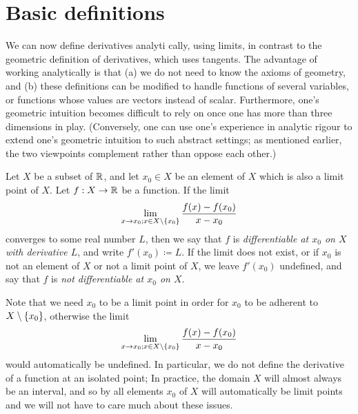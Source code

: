 \section{Basic definitions}\label{i:sec:10.1}

\begin{note}
  We can now define derivatives analyti cally, using limits, in contrast to the geometric definition of derivatives, which uses tangents.
  The advantage of working analytically is that
  (a) we do not need to know the axioms of geometry, and
  (b) these definitions can be modified to handle functions of several variables, or functions whose values are vectors instead of scalar.
  Furthermore, one's geometric intuition becomes difficult to rely on once one has more than three dimensions in play.
  (Conversely, one can use one's experience in analytic rigour to extend one's geometric intuition to such abstract settings;
  as mentioned earlier, the two viewpoints complement rather than oppose each other.)
\end{note}

\begin{defn}\label{i:10.1.1}
  Let \(X\) be a subset of \(\mathbb{R}\), and let \(x_0 \in X\) be an element of \(X\) which is also a limit point of \(X\).
  Let \(f : X \to \mathbb{R}\) be a function.
  If the limit
  \[
    \lim_{x \to x_0 ; x \in X \setminus \left\lbrace x_0\right\rbrace} \dfrac{f(x) - f(x_0)}{x - x_0}
  \]
  converges to some real number \(L\), then we say that \(f\) is \emph{differentiable at \(x_0\) on \(X\) with derivative \(L\)}, and write \(f'(x_0) \coloneqq L\).
  If the limit does not exist, or if \(x_0\) is not an element of \(X\) or not a limit point of \(X\), we leave \(f'(x_0)\) undefined, and say that \(f\) is \emph{not differentiable at \(x_0\) on \(X\)}.
\end{defn}

\begin{rmk}\label{i:10.1.2}
  Note that we need \(x_0\) to be a limit point in order for \(x_0\) to be adherent to \(X \setminus \left\lbrace x_0\right\rbrace\), otherwise the limit
  \[
    \lim_{x \to x_0 ; x \in X \setminus \left\lbrace x_0\right\rbrace} \dfrac{f(x) - f(x_0)}{x - x_0}
  \]
  would automatically be undefined.
  In particular, we do not define the derivative of a function at an isolated point;
  In practice, the domain \(X\) will almost always be an interval, and so by  all elements \(x_0\) of \(X\) will automatically be limit points and we will not have to care much about these issues.
\end{rmk}

